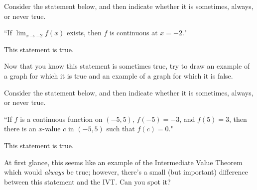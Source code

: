 \documentclass[handout]{ximera}
\begin{document}
\begin{exercise}
\begin{exercise}
\begin{exercise}
\end{exercise}

\begin{exercise}

Consider the statement below, and then indicate whether it is sometimes, always, or never true.

\begin{center} ``If $\displaystyle\lim_{x\to -2} f(x)$ exists, then $f$ is continuous at $x=-2$." \end{center}

This statement is  true.

\begin{feedback}[correct]

Now that you know this statement is sometimes true, try to draw an example of a graph for which it is true and an example of a graph for which it is false.  

\end{feedback}

\end{exercise}

\begin{exercise}

Consider the statement below, and then indicate whether it is sometimes, always, or never true.

\begin{center} ``If $f$ is a continuous function on $(-5, 5)$, $f(-5) = -3$, and $f(5) = 3$, then there is an $x$-value $c$ in $(-5,5)$ such that $f(c) = 0$." \end{center}

This statement is  true.

\begin{feedback}[correct]

At first glance, this seems like an example of the Intermediate Value Theorem which would \textit{always} be true; however, there's a small (but important) difference between this statement and the IVT.  Can you spot it?

\end{feedback}

\end{exercise}
\end{document}
